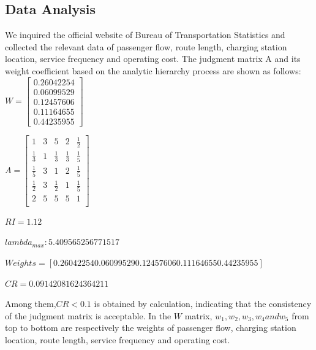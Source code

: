 \documentclass[12pt]{article}
\begin{document}
\subsection{Data Analysis}
We inquired the official website of Bureau of Transportation Statistics and collected the relevant data of passenger flow, 
route length, charging station location, service frequency and operating cost. The judgment matrix A and its weight coefficient 
based on the analytic hierarchy process are shown as follows:
$W = \begin{bmatrix}  
	0.26042254 \\  
	0.06099529 \\  
	0.12457606\\  
	0.11164655 \\
	0.44235955
  \end{bmatrix} $
  
$A = \begin{bmatrix}  
	1 & 3 & 5 & 2 & \frac{1}{2} \\  
	\frac{1}{3} & 1 & \frac{1}{3} & \frac{1}{3} & \frac{1}{5} \\  
	\frac{1}{5} & 3 & 1 & 2 & \frac{1}{5} \\  
	\frac{1}{2} & 3 & \frac{1}{2} & 1 & \frac{1}{5} \\
	2 & 5 & 5 & 5 & 1 \\  
  \end{bmatrix} $
  
  $RI=1.12$

  $lambda_{max}:5.409565256771517$

  $Weights=[0.26042254 0.06099529 0.12457606 0.11164655 0.44235955]$

  $CR=0.09142081624364211$

Among them,$CR<0.1$ is obtained by calculation, indicating that the consistency of the judgment matrix is acceptable. 
In the $W$ matrix, $w_1,w_2,w_3,w_4 and w_5$ from top to bottom are respectively the weights of passenger flow, charging station location, 
route length, service frequency and operating cost.
\end{document}
